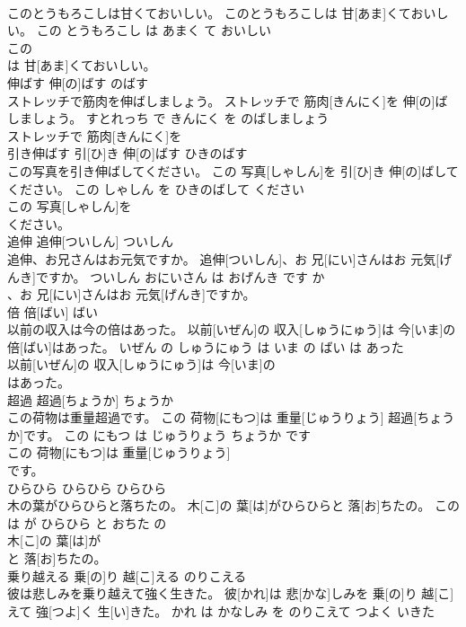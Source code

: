 \documentclass[8pt]{extreport}
\begin{document}
\begin{CJK}{UTF8}{min}
\\	このとうもろこしは甘くておいしい。	このとうもろこしは 甘[あま]くておいしい。	この とうもろこし は あまく て おいしい	
\\	この
\\	は 甘[あま]くておいしい。			
\\	伸ばす	伸[の]ばす	のばす	
\\	ストレッチで筋肉を伸ばしましょう。	ストレッチで 筋肉[きんにく]を 伸[の]ばしましょう。	すとれっち で きんにく を のばしましょう	
\\	ストレッチで 筋肉[きんにく]を
\\	引き伸ばす	引[ひ]き 伸[の]ばす	ひきのばす	
\\	この写真を引き伸ばしてください。	この 写真[しゃしん]を 引[ひ]き 伸[の]ばしてください。	この しゃしん を ひきのばして ください	
\\	この 写真[しゃしん]を
\\	ください。			
\\	追伸	追伸[ついしん]	ついしん	
\\	追伸、お兄さんはお元気ですか。	追伸[ついしん]、お 兄[にい]さんはお 元気[げんき]ですか。	ついしん おにいさん は おげんき です か	
\\	、お 兄[にい]さんはお 元気[げんき]ですか。			
\\	倍	倍[ばい]	ばい	
\\	以前の収入は今の倍はあった。	以前[いぜん]の 収入[しゅうにゅう]は 今[いま]の 倍[ばい]はあった。	いぜん の しゅうにゅう は いま の ばい は あった	
\\	以前[いぜん]の 収入[しゅうにゅう]は 今[いま]の
\\	はあった。			
\\	超過	超過[ちょうか]	ちょうか	
\\	この荷物は重量超過です。	この 荷物[にもつ]は 重量[じゅうりょう] 超過[ちょうか]です。	この にもつ は じゅうりょう ちょうか です	
\\	この 荷物[にもつ]は 重量[じゅうりょう]
\\	です。			
\\	ひらひら	ひらひら	ひらひら	
\\	木の葉がひらひらと落ちたの。	木[こ]の 葉[は]がひらひらと 落[お]ちたの。	このは が ひらひら と おちた の	
\\	木[こ]の 葉[は]が
\\	と 落[お]ちたの。			
\\	乗り越える	乗[の]り 越[こ]える	のりこえる	
\\	彼は悲しみを乗り越えて強く生きた。	彼[かれ]は 悲[かな]しみを 乗[の]り 越[こ]えて 強[つよ]く 生[い]きた。	かれ は かなしみ を のりこえて つよく いきた	

\end{CJK}
\end{document}
